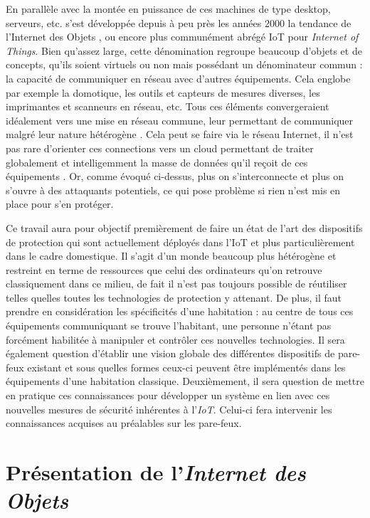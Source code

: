 \documentclass[]{article}
\begin{document}
\par En parallèle avec la montée en puissance de ces machines de type desktop, serveurs, etc. s'est développée depuis à peu près les années 2000 la tendance de l'\og Internet des Objets \fg{}, ou encore plus communément abrégé IoT pour \textit{Internet of Things}. Bien qu'assez large, cette dénomination regroupe beaucoup d'objets et de concepts, qu'ils soient virtuels ou non mais possédant un dénominateur commun : la capacité de communiquer en réseau avec d'autres équipements. Cela englobe par exemple la domotique, les outils et capteurs de mesures diverses, les imprimantes et scanneurs en réseau, etc. Tous ces éléments convergeraient idéalement vers une mise en réseau commune, leur permettant de communiquer malgré leur nature hétérogène \cite{Kubler2014}. Cela peut se faire via le réseau Internet, il n'est pas rare d'orienter ces connections vers un cloud permettant de traiter globalement et intelligemment la masse de données qu'il reçoit de ces équipements \cite{Huichen2016}. Or, comme évoqué ci-dessus, plus on s'interconnecte et plus on s'ouvre à des attaquants potentiels, ce qui pose problème si rien n'est mis en place pour s'en protéger.\\

\par Ce travail aura pour objectif premièrement de faire un état de l'art des dispositifs de protection qui sont actuellement déployés dans l'IoT et plus particulièrement dans le cadre domestique. Il s'agit d'un monde beaucoup plus hétérogène et restreint en terme de ressources que celui des ordinateurs qu'on retrouve classiquement dans ce milieu, de fait il n'est pas toujours possible de réutiliser telles quelles toutes les technologies de protection y attenant. De plus, il faut prendre en considération les spécificités d'une habitation : au centre de tous ces équipements communiquant se trouve l'habitant, une personne n'étant pas forcément habilitée à manipuler et contrôler ces nouvelles technologies. Il sera également question d'établir une vision globale des différentes dispositifs de pare-feux existant et sous quelles formes ceux-ci peuvent être implémentés dans les équipements d'une habitation classique. Deuxièmement, il sera question de mettre en pratique ces connaissances pour développer un système en lien avec ces nouvelles mesures de sécurité inhérentes à l'\textit{IoT}. Celui-ci fera intervenir les connaissances acquises au préalables sur les pare-feux.
\newpage
\section{Présentation de l'\textit{Internet des Objets}}\label{IoT}
\end{document}
